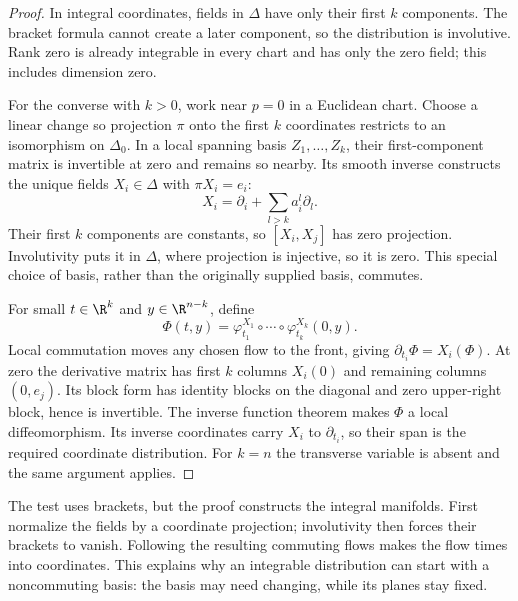 \begin{proof}
In integral coordinates, fields in $\Delta$ have only their first $k$ components. The bracket formula cannot create a later component, so the distribution is involutive. Rank zero is already integrable in every chart and has only the zero field; this includes dimension zero.

For the converse with $k>0$, work near $p=0$ in a Euclidean chart. Choose a linear change so projection $\pi$ onto the first $k$ coordinates restricts to an isomorphism on $\Delta_0$. In a local spanning basis $Z_1,\ldots,Z_k$, their first-component matrix is invertible at zero and remains so nearby. Its smooth inverse constructs the unique fields $X_i\in\Delta$ with $\pi X_i=e_i$:
\[
X_i=\partial_i+\sum_{l>k}a_i^l\partial_l.
\]
Their first $k$ components are constants, so $[X_i,X_j]$ has zero projection. Involutivity puts it in $\Delta$, where projection is injective, so it is zero. This special choice of basis, rather than the originally supplied basis, commutes.

For small $t\in\R^k$ and $y\in\R^{n-k}$, define
\[
\Phi(t,y)=\varphi^{X_1}_{t_1}\circ\cdots\circ\varphi^{X_k}_{t_k}(0,y).
\]
Local commutation moves any chosen flow to the front, giving $\partial_{t_i}\Phi=X_i(\Phi)$. At zero the derivative matrix has first $k$ columns $X_i(0)$ and remaining columns $(0,e_j)$. Its block form has identity blocks on the diagonal and zero upper-right block, hence is invertible. The inverse function theorem makes $\Phi$ a local diffeomorphism. Its inverse coordinates carry $X_i$ to $\partial_{t_i}$, so their span is the required coordinate distribution. For $k=n$ the transverse variable is absent and the same argument applies.
\end{proof}

\begin{beauty}
The test uses brackets, but the proof constructs the integral manifolds. First normalize the fields by a coordinate projection; involutivity then forces their brackets to vanish. Following the resulting commuting flows makes the flow times into coordinates. This explains why an integrable distribution can start with a noncommuting basis: the basis may need changing, while its planes stay fixed.
\end{beauty}


